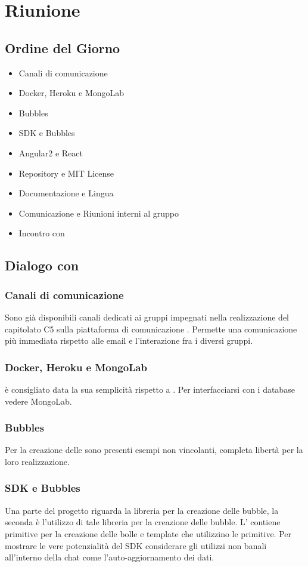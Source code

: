 \section{Riunione}
\subsection{Ordine del Giorno}
\begin{itemize}
	\item Canali di comunicazione
	\item Docker, Heroku e MongoLab
	\item Bubbles
	\item SDK e Bubbles
	\item Angular2 e React
	\item Repository e MIT License
	\item Documentazione e Lingua
	\item Comunicazione e Riunioni interni al gruppo \GroupName
	\item Incontro con \Proponente	
\end{itemize}

\subsection{Dialogo con \Proponente}
\subsubsection{Canali di comunicazione}
Sono già disponibili canali dedicati ai gruppi impegnati nella realizzazione del capitolato C5 sulla piattaforma di comunicazione . Permette una comunicazione più immediata rispetto alle email e l'interazione fra i diversi gruppi.

\subsubsection{Docker, Heroku e MongoLab}
 è consigliato data la sua semplicità rispetto a . 
Per interfacciarsi con i database vedere MongoLab.

\subsubsection{Bubbles}
Per la creazione delle  sono presenti esempi non vincolanti, completa libertà per la loro realizzazione.

\subsubsection{SDK e Bubbles}
Una parte del progetto riguarda la libreria per la creazione delle bubble, la seconda è l'utilizzo di tale libreria per la creazione delle bubble. L' contiene primitive per la creazione delle bolle e template che utilizzino le primitive.
Per mostrare le vere potenzialità del SDK considerare gli utilizzi non banali all'interno della chat come l'auto-aggiornamento dei dati.

